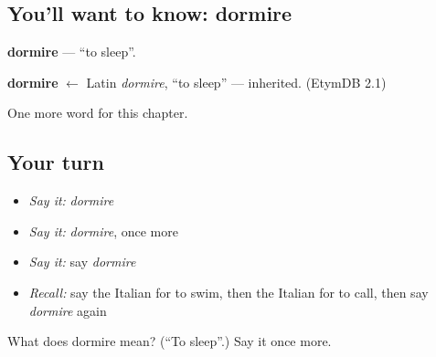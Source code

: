 \subsection*{You'll want to know: dormire}
\textbf{dormire} — \textquotedblleft{}to sleep\textquotedblright{}.

\begin{cousinweb}
\textbf{dormire} $\leftarrow$ Latin \emph{dormire}, \textquotedblleft{}to sleep\textquotedblright{} — inherited. (EtymDB 2.1)
\end{cousinweb}

\begin{grammarlens}[title={What you've built}]
One more word for this chapter.
\end{grammarlens}

\subsection*{Your turn}
\begin{itemize}
\raggedright
  \item \emph{Say it:} \emph{dormire}
  \item \emph{Say it:} \emph{dormire}, once more
  \item \emph{Say it:} say \emph{dormire}
  \item \emph{Recall:} say the Italian for to swim, then the Italian for to call, then say \emph{dormire} again
\end{itemize}

\begin{tcolorbox}[breakable,colback=teal!4,colframe=teal!35!black,title={Before you move on}]
What does dormire mean? (\textquotedblleft{}To sleep\textquotedblright{}.) Say it once more.
\end{tcolorbox}

